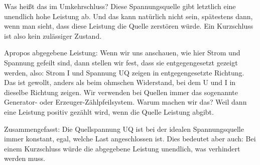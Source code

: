 \begin{frame}
{        Was heißt das im Umkehrschluss? Diese Spannungsquelle gibt letztlich eine unendlich hohe Leistung ab.
        Und das kann natürlich nicht sein, spätestens dann, wenn man sieht, dass diese Leistung die Quelle zerstören würde.
        Ein Kurzschluss ist also kein zulässiger Zustand.
        
        Apropos abgegebene Leistung:
        Wenn wir uns anschauen, wie hier Strom und Spannung gefeilt sind, dann stellen wir fest,
        dass sie entgegengesetzt gezeigt werden, also: Strom I und Spannung UQ zeigen in entgegengesetzte Richtung.
        Das ist gewollt, anders als beim ohmschen Widerstand, bei dem U und I in dieselbe Richtung zeigen.
        Wir verwenden bei Quellen immer das sogenannte Generator- oder Erzeuger-Zählpfeilsystem.
        Warum machen wir das? Weil dann eine Leistung positiv gezählt wird, wenn die Quelle Leistung abgibt.
        
        Zusammengefasst:
        Die Quellspannung UQ ist bei der idealen Spannungsquelle immer konstant, egal, welche Last angeschlossen ist.
        Dies bedeutet aber auch: Bei einem Kurzschluss würde die abgegebene Leistung unendlich, was verhindert werden muss.
    }
\end{frame}


